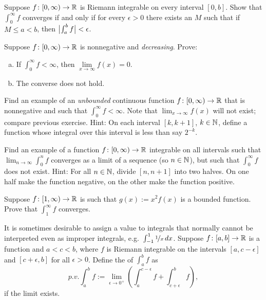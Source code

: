 \begin{exercise}
Suppose $f \colon [0,\infty) \to {\mathbb{R}}$ is Riemann integrable on every interval
$[0,b]$.  Show that  $\int_0^\infty f$ converges if and only if
for every $\epsilon > 0$ there exists an $M$ such that if $M \leq a < b$,
then $\bigl\lvert {\int_a^b f} \bigr\rvert < \epsilon$.
\end{exercise}

\begin{exercise}
Suppose $f \colon [0,\infty) \to {\mathbb{R}}$ is nonnegative and
\emph{decreasing}.  Prove:
\begin{enumerate}[a)]
\item
If $\int_0^\infty f < \infty$, then $\lim\limits_{x\to\infty} f(x) = 0$.
\item
The converse does not hold.
\end{enumerate}
\end{exercise}

\begin{exercise}
Find an example of an \emph{unbounded} continuous function $f \colon
[0,\infty) \to {\mathbb{R}}$ that is nonnegative and such that $\int_0^\infty f < \infty$.
Note that $\lim_{x\to\infty} f(x)$ will not exist; compare
previous exercise.
Hint: On each interval $[k,k+1]$, $k \in {\mathbb{N}}$, define a function whose
integral over this interval is less than say $2^{-k}$.
\end{exercise}

\begin{exercise}
Find an example of a function $f \colon [0,\infty) \to {\mathbb{R}}$ integrable on all
intervals such that $\lim_{n\to\infty} \int_0^n f$ converges as a
limit of a sequence (so $n \in {\mathbb{N}}$), but such that
$\int_0^\infty f$ does not exist.
Hint: For all $n\in {\mathbb{N}}$, divide $[n,n+1]$ into two halves.  On one half
make the function negative, on the other make the function positive.
\end{exercise}

\begin{exercise}
Suppose $f \colon [1,\infty) \to {\mathbb{R}}$ is such that
$g(x) := x^2 f(x)$ is a bounded function. Prove that
$\int_1^\infty f$ converges.
\end{exercise}

\begin{exnote}
It is sometimes desirable to assign a value to integrals that normally
cannot be interpreted even as improper integrals,
e.g.\ $\int_{-1}^1 \nicefrac{1}{x}\,dx$.
Suppose $f \colon [a,b] \to {\mathbb{R}}$ is a function and $a < c < b$,
where $f$ is Riemann integrable on the intervals
$[a,c-\epsilon]$ and $[c+\epsilon,b]$ for all $\epsilon > 0$.
Define
the \emph{} of $\int_a^b f$ as
\begin{equation*}
p.v.\!\int_a^b f := \lim_{\epsilon\to 0^+}
\left(
\int_a^{c-\epsilon} f + 
\int_{c+\epsilon}^b f
\right) ,
\end{equation*}
if the limit exists.
\end{exnote}

